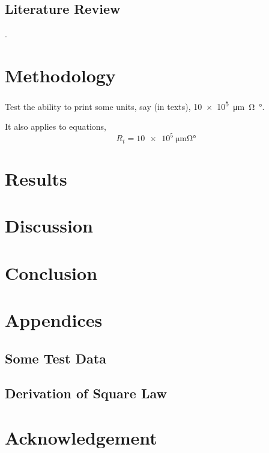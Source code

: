 \documentclass{senior-design}
\begin{document}
\section{Literature Review}
\lipsum[2]\cite{j.a.prufrock2009,li1999,ref1}.
\chapter{Methodology}

Test the ability to print some units, say (in texts), \SI{10e5}{\um\ohm\degree}.

It also applies to equations,
\begin{equation}
    R_{t}=\SI{10e5}{\um\ohm\degree}
\end{equation}
\chapter{Results}

\chapter{Discussion}

\chapter{Conclusion}


\renewcommand*{\UrlFont}{\rmfamily}
\printbibliography[title={References},heading=bibintoc]

\backmatter
\chapter{Appendices}
\renewcommand{\thesection}{\Alph{section}}
\section{Some Test Data}

\section{Derivation of Square Law}

\renewcommand{\thesection}{\arabic{chapter}.\arabic{section}}

\chapter{Acknowledgement}

\end{document}
